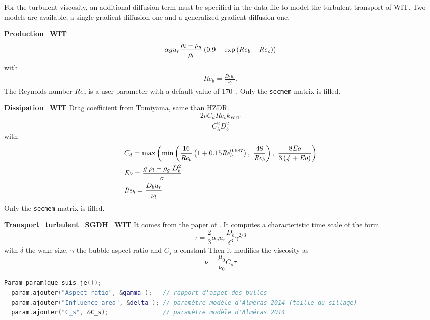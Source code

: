 For the turbulent viscosity, an additional diffusion term must be specified in the data file to model the turbulent transport of WIT. Two models are available, a single gradient diffusion one and a generalized gradient diffusion one. 



\textbf{Production_WIT}
\begin{equation}
    \alpha{}g u_r\frac{\rho_l - \rho_g}{\rho_l}\left( 0.9 - \exp\left( Re_b-Re_c \right) \right)
\end{equation}
with
\begin{align}
    \mathit{Re}_b = \frac{D_b u_r}{\nu_l}.
\end{align}
The Reynolds number $\mathit{Re}_c$ is a user parameter with a default value of 170~\cite{DuCluzeau2019}. Only the \texttt{secmem} matrix is filled.



\textbf{Dissipation_WIT}
Drag coefficient from Tomiyama, same than HZDR.
\begin{equation}
    \frac{2\nu C_d \mathit{Re}_b k_{\text{WIT}}}{C_{\lambda}^2 D_b^2}
\end{equation}
with
\begin{align}
    &C_d = \max\parent{\min\parent{\frac{16}{\mathit{Re}_b}\parent{1+0.15\mathit{Re}_b^{0.687}},\ \frac{48}{\mathit{Re}_b}},\ \frac{8\mathit{Eo}}{3\parent{\mathit{4+Eo}}}}\\
    &\mathit{Eo} = \frac{g\norm{\rho_l - \rho_g}D_b^2}{\sigma}\\
    &\mathit{Re}_b = \frac{D_b u_r}{\nu_l}
\end{align}
 Only the \texttt{secmem} matrix is filled.
 


\textbf{Transport_turbulent_SGDH_WIT}
It comes from the paper of \textcite{Almeras2014}.
It computes a characteristic time scale of the form
\begin{equation}
    \tau = \frac{2}{3} \alpha_g u_r \frac{D_b}{\delta^3} \gamma^{2/3}
\end{equation}
with $\delta$ the wake size, $\gamma$ the bubble aspect ratio and $C_s$ a constant
Then it modifies the viscosity as 
\begin{equation}
    \nu = \frac{\mu_0}{\nu_0}C_s \tau
\end{equation}

\begin{lstlisting}[language=c++]
  Param param(que_suis_je());
  param.ajouter("Aspect_ratio", &gamma_);   // rapport d'aspet des bulles
  param.ajouter("Influence_area", &delta_); // paramètre modèle d'Alméras 2014 (taille du sillage)
  param.ajouter("C_s", &C_s);               // paramètre modèle d'Alméras 2014
\end{lstlisting}



